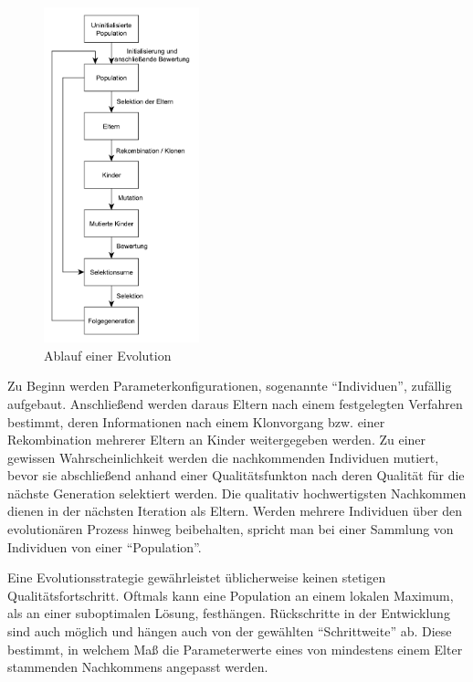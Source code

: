 \begin{figure}[H]
\centering
\includegraphics[width=0.4\textwidth]{img/ablauf_einer_evolution.pdf}
\caption[Ablauf einer Evolution]{Ablauf einer Evolution\protect\footnotemark}
\label{fig:ablauf_einer_evolution}
\end{figure}

Zu Beginn werden Parameterkonfigurationen, sogenannte \enquote{Individuen}, zufällig aufgebaut.
Anschließend werden daraus Eltern nach einem festgelegten Verfahren bestimmt, deren Informationen nach einem Klonvorgang bzw. einer Rekombination mehrerer Eltern an Kinder weitergegeben werden.
Zu einer gewissen Wahrscheinlichkeit werden die nachkommenden Individuen mutiert, bevor sie abschließend anhand einer Qualitätsfunkton nach deren Qualität für die nächste Generation selektiert werden.
Die qualitativ hochwertigsten Nachkommen dienen in der nächsten Iteration als Eltern.
Werden mehrere Individuen über den evolutionären Prozess hinweg beibehalten, spricht man bei einer Sammlung von Individuen von einer \enquote{Population}.

Eine Evolutionsstrategie gewährleistet üblicherweise keinen stetigen Qualitätsfortschritt. Oftmals kann eine Population an einem lokalen Maximum, als an einer suboptimalen Lösung, festhängen. Rückschritte in der Entwicklung sind auch möglich und hängen auch von der gewählten \enquote{Schrittweite} ab. Diese bestimmt, in welchem Maß die Parameterwerte eines von mindestens einem Elter stammenden Nachkommens angepasst werden.

